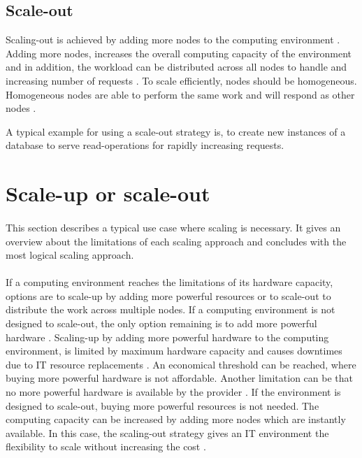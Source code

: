 \documentclass{article}
\begin{document}
\subsection{Scale-out}
Scaling-out is achieved by adding more nodes to the computing environment \cite{Wilder2012CloudPatterns}. Adding more nodes, increases the overall computing capacity of the environment and in addition, the workload can be distributed across all nodes to handle and increasing number of requests \cite{Wilder2012CloudPatterns, Abbott2015ScalabilityArt}.
To scale efficiently, nodes should be homogeneous. Homogeneous nodes are able to perform the same work and will respond as other nodes \cite{Abbott2015ScalabilityArt}.


A typical example for using a scale-out strategy is, to create new instances of a database to serve read-operations for rapidly increasing requests.


\section{Scale-up or scale-out}
\paragraph{}
This section describes a typical use case where scaling is necessary. It gives an overview about the limitations of each scaling approach and concludes with the most logical scaling approach.


\paragraph{}
If a computing environment reaches the limitations of its hardware capacity, options are to scale-up by adding more powerful resources or to scale-out to distribute the work across multiple nodes. If a computing environment is not designed to scale-out, the only option remaining is to add more powerful hardware \cite{Abbot2011ScalabilityRules}.
Scaling-up by adding more powerful hardware to the computing environment, is limited by maximum hardware capacity and causes downtimes due to IT resource replacements \cite{Mahmood2013CloudConcepts}. An economical threshold can be reached, where buying more powerful hardware is not affordable. Another limitation can be that no more powerful hardware is available by the provider \cite{Abbot2011ScalabilityRules, Wilder2012CloudPatterns}.
If the environment is designed to scale-out, buying more powerful resources is not needed. The computing capacity can be increased by adding more nodes which are instantly available. In this case, the scaling-out strategy gives an IT environment the flexibility to scale without increasing the cost \cite{Abbot2011ScalabilityRules}.
\end{document}
